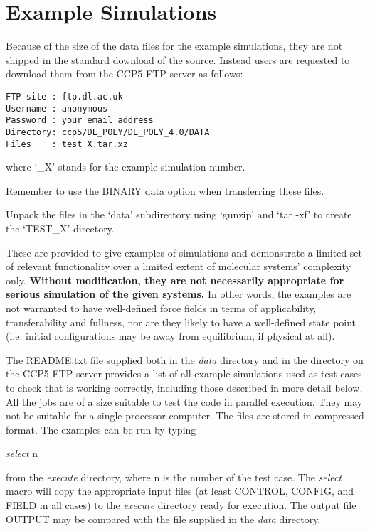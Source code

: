 \section{Example Simulations}

Because of the size of the data files for the \D
example simulations, they are not shipped in the standard
download of the \D source.  Instead users are requested
to download them from the CCP5 FTP server as follows:

\begin{lstlisting}
FTP site : ftp.dl.ac.uk
Username : anonymous
Password : your email address
Directory: ccp5/DL_POLY/DL_POLY_4.0/DATA
Files    : test_X.tar.xz
\end{lstlisting}

where `\_X' stands for the example simulation number.

Remember to use the BINARY data option when transferring these
files.

Unpack the files in the `data' subdirectory using `gunzip' and
`tar -xf' to create the `TEST\_X' directory.

These are provided to give examples of \D simulations
and demonstrate a limited set of relevant functionality over
a limited extent of molecular systems' complexity only.
{\bf Without modification, they are not necessarily appropriate
for serious simulation of the given systems.} In other words,
the examples are not warranted to have well-defined force
fields in terms of applicability, transferability and fullness, nor
are they likely to have a well-defined state point (i.e. initial
configurations may be away from equilibrium, if physical at all).

The README.txt file supplied both in the {\em data} directory and
in the directory on the CCP5 FTP server provides a list of all
example simulations used as test cases to check that \D is working
correctly, including those described in more detail below.  All the
jobs are of a size suitable to test the code in parallel execution.  They
may not be suitable for a single processor computer.  The files
are stored in compressed format.  The examples can be run by typing

{\sl select } n

\noindent from the {\em execute} directory, where n is the number of
the test case.  The {\sl select} macro will copy the appropriate
input files (at least CONTROL, CONFIG, and FIELD in all cases)
to the {\em execute} directory ready for execution.  The output file
OUTPUT may be compared with the file supplied in the {\em data}
directory.

